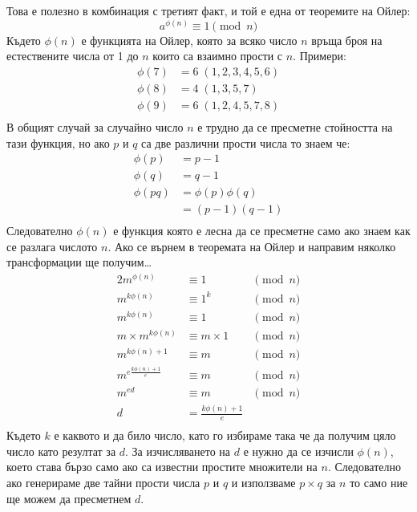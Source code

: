 Това е полезно в комбинация с третият факт, и той е една от теоремите на Ойлер:
$$a^{\phi(n)} \equiv 1 \pmod n$$
Където $\phi(n)$ е функцията на Ойлер, която за всяко число $n$ връща броя на естествените числа от 1 до $n$ които са взаимно прости с $n$. Примери:
\begin{equation*}
\begin{split}
  \phi(7) &= 6 \; (1,2,3,4,5,6)\\
  \phi(8) &= 4 \; (1,3,5,7) \\
  \phi(9) &= 6 \; (1,2,4,5,7,8) \\
\end{split}
\end{equation*}
В общият случай за случайно число $n$ е трудно да се пресметне стойността на тази функция, но ако $p$ и $q$ са две различни прости числа то знаем че:
\begin{equation*}
\begin{split}
\phi(p) &= p-1 \\
\phi(q) &= q-1 \\
\phi(pq) &= \phi(p)\phi(q) \\
&= (p-1)(q-1) \\
\end{split}
\end{equation*}
Следователно $\phi(n)$ е функция която е лесна да се пресметне само ако знаем как се разлага числото $n$. Ако се върнем в теоремата на Ойлер и направим няколко трансформации ще получим\ldots
\begin{alignat*}{2}
m^{\phi(n)} &\equiv 1 &\pmod n \\
m^{k\phi(n)} &\equiv 1^k &\pmod n \\
m^{k\phi(n)} &\equiv 1 &\pmod n \\
m\times m^{k\phi(n)} &\equiv m\times 1 &\pmod n \\
m^{k\phi(n)+1} &\equiv m &\pmod n \\
m^{e\frac{k\phi(n)+1}{e}} &\equiv m &\pmod n \\
m^{ed} &\equiv m &\pmod n\\
d &= \frac{k\phi(n)+1}{e} \\
\end{alignat*}
Където $k$ е каквото и да било число, като го избираме така че да получим цяло число като резултат за $d$. За изчисляването на $d$ е нужно да се изчисли $\phi(n)$, което става бързо само ако са известни простите множители на $n$. Следователно ако генерираме две тайни прости числа $p$ и $q$ и използваме $p\times q$ за $n$ то само ние ще можем да пресметнем $d$.

